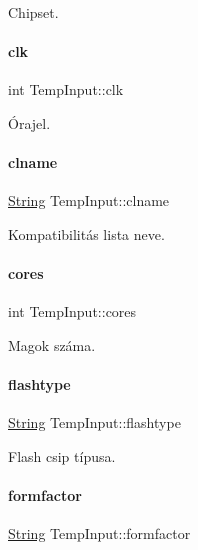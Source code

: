 Chipset. 

\mbox{\label{struct_temp_input_aa76fe14a614fef6e9239ce2283d6b102}} 
\paragraph{\texorpdfstring{clk}{clk}}
{\footnotesize\ttfamily int Temp\+Input\+::clk}



Órajel. 

\mbox{\label{struct_temp_input_a623b1fe5692319aad5c58cbc42bedf9c}} 
\paragraph{\texorpdfstring{clname}{clname}}
{\footnotesize\ttfamily \mbox{\hyperlink{class_string}{String}} Temp\+Input\+::clname}



Kompatibilitás lista neve. 

\mbox{\label{struct_temp_input_a9b99532e6c984fb19c34ed943a6d5750}} 
\paragraph{\texorpdfstring{cores}{cores}}
{\footnotesize\ttfamily int Temp\+Input\+::cores}



Magok száma. 

\mbox{\label{struct_temp_input_aca0d9830369aab845fc274c6b54ffe33}} 
\paragraph{\texorpdfstring{flashtype}{flashtype}}
{\footnotesize\ttfamily \mbox{\hyperlink{class_string}{String}} Temp\+Input\+::flashtype}



Flash csip típusa. 

\mbox{\label{struct_temp_input_a402c6984d9e94d4c76e460d0368613f3}} 
\paragraph{\texorpdfstring{formfactor}{formfactor}}
{\footnotesize\ttfamily \mbox{\hyperlink{class_string}{String}} Temp\+Input\+::formfactor}



